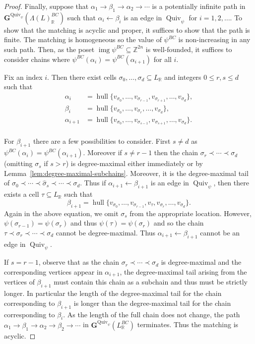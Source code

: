 \documentclass{amsart}
\newcommand{\ZZ}{\mathbb{Z}}
\newcommand{\RR}{\mathbb{R}}
\newcommand{\graph}{\mathbf{G}}
\DeclareMathOperator{\img}{img}
\newcommand{\Quiv}{\operatorname{Quiv}}
\DeclareMathOperator{\hull}{hull}
\theoremstyle{remark}
\begin{document}
\begin{proof}
  Finally, suppose that $\alpha_1\rightarrow \beta_1 \rightarrow \alpha_2 \rightarrow \cdots$ is a potentially infinite path in $\graph^{\Quiv_\psi}(\Lambda(L)_{\RR}^{BC})$ such that $\alpha_i\leftarrow \beta_i$ is an edge in $\Quiv_\psi$ for $i=1,2,\ldots$.
  To show that the matching is acyclic and proper, it suffices to show that the path is finite.
  The matching is homogeneous so the value of $\psi^{BC}$ is non-increasing in any such path.
  Then, as the poset $\img \psi^{BC}\subseteq \ZZ^{2n}$ is well-founded,
  it suffices to consider chains where $\psi^{BC}(\alpha_i)=\psi^{BC}(\alpha_{i+1})$ for all $i$.

  Fix an index $i$. Then there exist cells $\sigma_0,\ldots,\sigma_d\subseteq L_{\RR}$ and integers $0\leq r,s\leq d$ such that
  \begin{align*}
    \alpha_i&=\hull\{v_{\sigma_0},\ldots,v_{\sigma_{r-1}},v_{\sigma_{r+1}},\ldots,v_{\sigma_d}\},\\
    \beta_i &= \hull\{v_{\sigma_0},\ldots,v_{\sigma_{r}},\ldots,v_{\sigma_d}\},\\
    \alpha_{i+1} &= \hull\{v_{\sigma_0},\ldots,v_{\sigma_{s-1}},v_{\sigma_{s+1}},\ldots,v_{\sigma_d}\}.\\
  \end{align*}
  
  For $\beta_{i+1}$ there are a few possibilities to consider.
  First $s\neq d$ as $\psi^{BC}(\alpha_i)=\psi^{BC}(\alpha_{i+1})$.
  Moreover if $s\neq r-1$ then the chain $\sigma_{r}\prec \cdots \prec \sigma_d$ (omitting $\sigma_s$ if $s>r$)
  is degree-maximal either immediately or by Lemma~\ref{lem:degree-maximal-subchains}.
  Moreover, it is the degree-maximal tail of $\sigma_0\prec \cdots \prec \widehat{\sigma}_s\prec \cdots \prec \sigma_d$. Thus if $\alpha_{i+1}\leftarrow \beta_{i+1}$ is an edge in $\Quiv_\psi$, then there exists a cell $\tau\subseteq L_{\RR}$ such that
  \[\beta_{i+1} = \hull\{v_{\sigma_0},\ldots,v_{\sigma_{r-1}},v_{\tau},v_{\sigma_{r}},\ldots,v_{\sigma_d}\}.\]
  Again in the above equation, we omit $\sigma_s$ from the appropriate location.
  However, $\psi(\sigma_{r-1})=\psi(\sigma_r)$ and thus $\psi(\tau)=\psi(\sigma_r)$ and so the chain $\tau\prec \sigma_r\prec \cdots \prec \sigma_d$ cannot be degree-maximal. Thus $\alpha_{i+1}\leftarrow \beta_{i+1}$ cannot be an edge in $\Quiv_\psi$.

  If $s = r-1$, observe that as the chain $\sigma_{r}\prec \cdots \prec \sigma_d$ is degree-maximal and the corresponding vertices appear in $\alpha_{i+1}$, the degree-maximal tail arising from the vertices of $\beta_{i+1}$ must contain this chain as a subchain and thus must be strictly longer. In particular the length of the degree-maximal tail for the chain corresponding to $\beta_{i+1}$ is longer than the degree-maximal tail for the chain corresponding to $\beta_i$. As the length of the full chain does not change, the path $\alpha_1\rightarrow \beta_1\rightarrow \alpha_2 \rightarrow \beta_2 \rightarrow \cdots$ in $\graph^{\Quiv_\psi}(L_{\RR}^{BC})$ terminates.
  Thus the matching is acyclic.
\end{proof}
\end{document}
